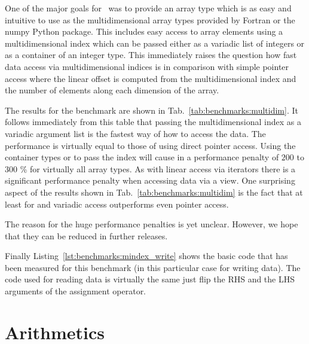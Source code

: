 One of the major goals for \libpnicore\ was to provide an array type which is as
easy and intuitive to use as the multidimensional array types provided by
Fortran or the numpy Python package. This includes easy access to array elements
using a multidimensional index which can be passed either as a variadic list of 
integers or as a container of an integer type. 
This immediately raises the question how fast data access via multidimensional 
indices is  in comparison with simple pointer access where the linear offset is
computed from the multidimensional index and the number of elements along each
dimension of the array. 

The results for the benchmark are shown in Tab.~\ref{tab:benchmarks:multidim}.
It follows immediately from this table that passing the multidimensional index
as a variadic argument list is the fastest way of how to access the data. 
The performance is virtually equal to those of using direct pointer access. 
Using the container types  or  to pass the
index will cause in a performance penalty of $200$ to $300$ \% for virtually all
array types. 
As with linear access via iterators there is a significant performance penalty
when accessing data via a view. One surprising aspect of the results shown in 
Tab.~\ref{tab:benchmarks:multidim} is the fact that at least for 
 and  variadic access outperforms even 
pointer access.

The reason for the huge performance penalties is yet unclear. However, we hope
that they can be reduced in further releases. 

Finally Listing~\ref{lst:benchmarks:mindex_write} shows the basic code that has
been measured for this benchmark (in this particular case for writing data). The
code used for reading data is virtually the same just flip the RHS and the LHS
arguments of the assignment operator.

\section{Arithmetics}

